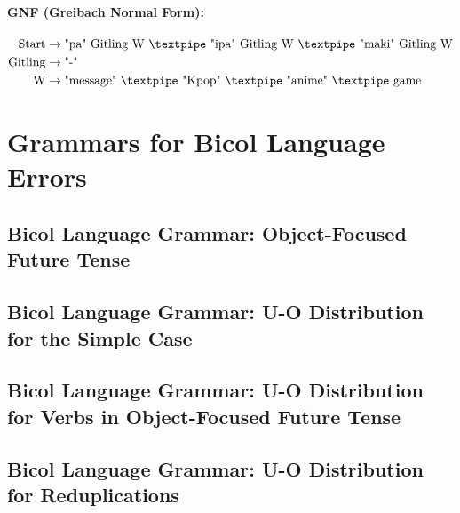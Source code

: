 \paragraph{GNF (Greibach Normal Form):}

\begin{equation*}
    \begin{aligned}
        \text{Start}   & \rightarrow \text{"pa" Gitling W {\textpipe} "ipa" Gitling W {\textpipe} "maki" Gitling W}\\
        \text{Gitling} & \rightarrow \text{"-"}\\
        \text{W} & \rightarrow \text{"message" {\textpipe} "Kpop" {\textpipe} "anime" {\textpipe} game}\\
    \end{aligned}
\end{equation*}

\section{Grammars for Bicol Language Errors}
\subsection{Bicol Language Grammar: Object-Focused Future Tense}
\subsection{Bicol Language Grammar: U-O Distribution for the Simple Case}
\subsection{Bicol Language Grammar: U-O Distribution for Verbs in Object-Focused Future Tense}
\subsection{Bicol Language Grammar: U-O Distribution for Reduplications}
